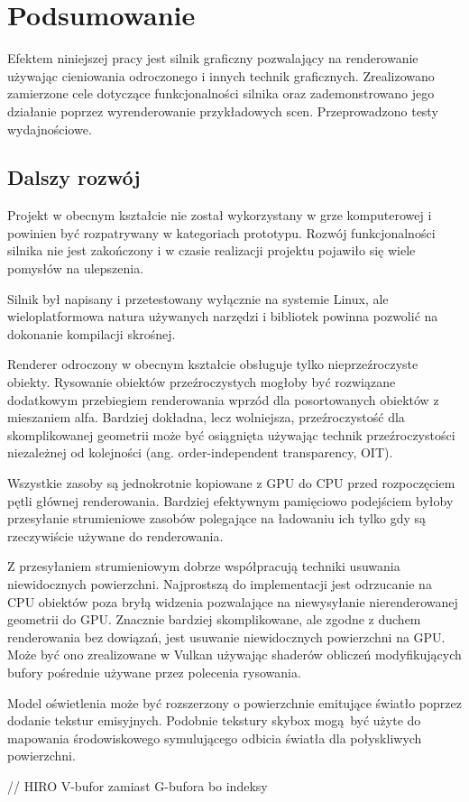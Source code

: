 \chapter{Podsumowanie}
\label{chap:summary}

Efektem niniejszej pracy jest silnik graficzny pozwalający na renderowanie używając cieniowania odroczonego i innych technik graficznych.
Zrealizowano zamierzone cele dotyczące funkcjonalności silnika oraz zademonstrowano jego działanie poprzez wyrenderowanie przykładowych scen. Przeprowadzono testy wydajnościowe.

\section{Dalszy rozwój}

Projekt w obecnym kształcie nie został wykorzystany w grze komputerowej i powinien być rozpatrywany w kategoriach prototypu.
Rozwój funkcjonalności silnika nie jest zakończony i w czasie realizacji projektu pojawiło się wiele pomysłów na ulepszenia.

Silnik był napisany i przetestowany wyłącznie na systemie Linux, ale wieloplatformowa natura używanych narzędzi i bibliotek powinna pozwolić na dokonanie kompilacji skrośnej.

Renderer odroczony w obecnym kształcie obsługuje tylko nieprzeźroczyste obiekty. Rysowanie obiektów przeźroczystych mogłoby być rozwiązane dodatkowym przebiegiem renderowania wprzód dla posortowanych obiektów z mieszaniem alfa. Bardziej dokładna, lecz wolniejsza, przeźroczystość dla skomplikowanej geometrii może być osiągnięta używając technik przeźroczystości niezależnej od kolejności (ang. order-independent transparency, OIT).

Wszystkie zasoby są jednokrotnie kopiowane z GPU do CPU przed rozpoczęciem pętli głównej renderowania.
Bardziej efektywnym pamięciowo podejściem byłoby przesyłanie strumieniowe zasobów polegające na ładowaniu ich tylko gdy są rzeczywiście używane do renderowania.

Z przesyłaniem strumieniowym dobrze współpracują techniki usuwania niewidocznych powierzchni.
Najprostszą do implementacji jest odrzucanie na CPU obiektów poza bryłą widzenia pozwalające na niewysyłanie nierenderowanej geometrii do GPU.
Znacznie bardziej skomplikowane, ale zgodne z duchem renderowania bez dowiązań, jest usuwanie niewidocznych powierzchni na GPU. Może być ono zrealizowane w Vulkan używając shaderów obliczeń modyfikujących bufory pośrednie używane przez polecenia rysowania.

Model oświetlenia może być rozszerzony o powierzchnie emitujące światło poprzez dodanie tekstur emisyjnych.
Podobnie tekstury skybox mogą być użyte do mapowania środowiskowego symulującego odbicia światła dla połyskliwych powierzchni.

// HIRO V-bufor zamiast G-bufora bo indeksy

